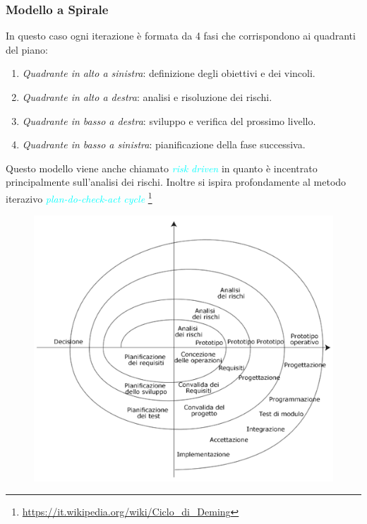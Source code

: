 \newpage

\subsubsection{Modello a Spirale}

In questo caso ogni iterazione è formata da 4 fasi che corrispondono ai quadranti del piano:
\begin{enumerate}
    \item \emph{Quadrante in alto a sinistra}: definizione degli obiettivi e dei vincoli.
    \item \emph{Quadrante in alto a destra}: analisi e risoluzione dei rischi.
    \item \emph{Quadrante in basso a destra}: sviluppo e verifica del prossimo livello.
    \item \emph{Quadrante in basso a sinistra}: pianificazione della fase successiva.
\end{enumerate}

Questo modello viene anche chiamato \emph{\textcolor{cyan}{risk driven}} in quanto è incentrato principalmente sull'analisi
dei rischi. Inoltre si ispira profondamente al metodo iterazivo \emph{\textcolor{cyan}{plan-do-check-act cycle}} \footnote{\url{https://it.wikipedia.org/wiki/Ciclo_di_Deming}}

\begin{figure}[h]
    \begin{center}
        \includegraphics[scale=0.4]{img/modellospirale.png}
    \end{center}
\end{figure}

